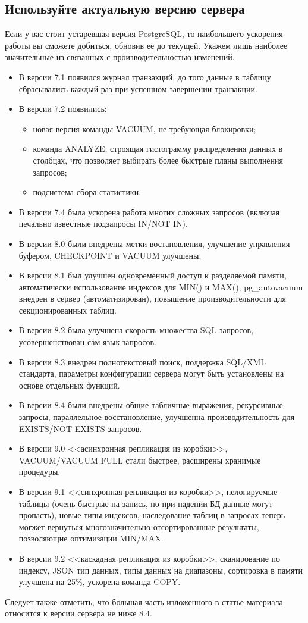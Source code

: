 \subsection{Используйте актуальную версию сервера}
Если у вас стоит устаревшая версия PostgreSQL, то наибольшего ускорения работы вы сможете 
добиться, обновив её до текущей. Укажем лишь наиболее значительные из связанных с производительностью изменений.
\begin{itemize}
\item В версии 7.1 появился журнал транзакций, до того данные в таблицу сбрасывались каждый раз при успешном завершении транзакции.
\item В версии 7.2 появились:
\begin{itemize}
\item новая версия команды VACUUM, не требующая блокировки;
\item команда ANALYZE, строящая гистограмму распределения данных в столбцах, что позволяет выбирать более 
быстрые планы выполнения запросов;
\item подсистема сбора статистики.
\end{itemize}
\item В версии 7.4 была ускорена работа многих сложных запросов (включая печально известные подзапросы IN/NOT IN).
\item В версии 8.0 были внедрены метки востановления, улучшение управления буфером, CHECKPOINT и VACUUM улучшены.
\item В версии 8.1 был улучшен одновременный доступ к разделяемой памяти, автоматически использование индексов для MIN() и MAX(),
pg\_autovacuum внедрен в сервер (автоматизирован), повышение производительности для секционированных таблиц.
\item В версии 8.2 была улучшена скорость множества SQL запросов, усовершенствован сам язык запросов. 
\item В версии 8.3 внедрен полнотекстовый поиск, поддержка SQL/XML стандарта, параметры конфигурации сервера могут быть 
установлены на основе отдельных функций.
\item В версии 8.4 были внедрены общие табличные выражения, рекурсивные запросы, параллельное восстановление, улучшенна 
производительность для EXISTS/NOT EXISTS запросов.
\item В версии 9.0 <<асинхронная репликация из коробки>>, VACUUM/VACUUM FULL стали быстрее, расширены хранимые процедуры.
\item В версии 9.1 <<синхронная репликация из коробки>>, нелогируемые таблицы (очень быстрые на запись, но при падении БД данные могут пропасть), новые типы индексов, наследование таблиц в запросах теперь могжет вернуться многозначительно отсортированные результаты, позволяющие оптимизации MIN/MAX.
\item В версии 9.2 <<каскадная репликация из коробки>>, сканирование по индексу, JSON тип данных, типы данных на диапазоны, сортировка в памяти улучшена на 25\%, ускорена команда COPY.
\end{itemize}
Следует также отметить, что большая часть изложенного в статье материала относится к версии сервера не ниже 8.4.

